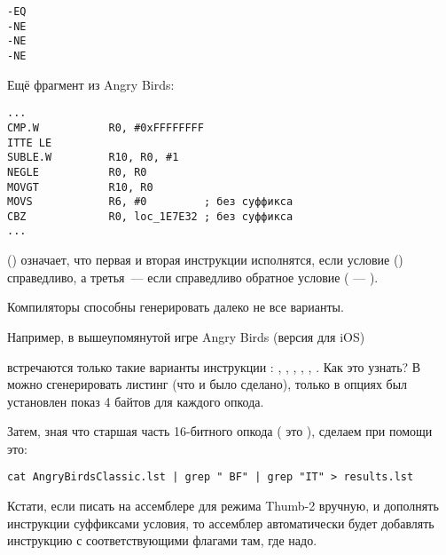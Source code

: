 \begin{lstlisting}
-EQ
-NE
-NE
-NE
\end{lstlisting}

Ещё фрагмент из Angry Birds:

\begin{lstlisting}[caption=Angry Birds Classic]
...
CMP.W           R0, #0xFFFFFFFF
ITTE LE
SUBLE.W         R10, R0, #1
NEGLE           R0, R0
MOVGT           R10, R0
MOVS            R6, #0         ; без суффикса
CBZ             R0, loc_1E7E32 ; без суффикса
...
\end{lstlisting}

 () 
означает, что первая и вторая инструкции исполнятся, если условие  ()
справедливо, а третья~--- если справедливо обратное условие ( --- ).

Компиляторы способны генерировать далеко не все варианты.

Например, в вышеупомянутой игре Angry Birds (версия  для iOS)

встречаются только такие варианты инструкции : 
, , , , , .
\myindex{\GrepUsage}
Как это узнать?
В \IDA можно сгенерировать листинг (что и было сделано), только в опциях был установлен показ 4 байтов для каждого опкода.

Затем, зная что старшая часть 16-битного опкода ( это ), сделаем при помощи  это:

\begin{lstlisting}
cat AngryBirdsClassic.lst | grep " BF" | grep "IT" > results.lst
\end{lstlisting}

Кстати, если писать на ассемблере для режима Thumb-2 вручную, и дополнять инструкции суффиксами
условия, то ассемблер автоматически будет добавлять инструкцию  с соответствующими флагами там,
где надо.

\myparagraph{\NonOptimizingXcodeIV (\ARMMode)}

